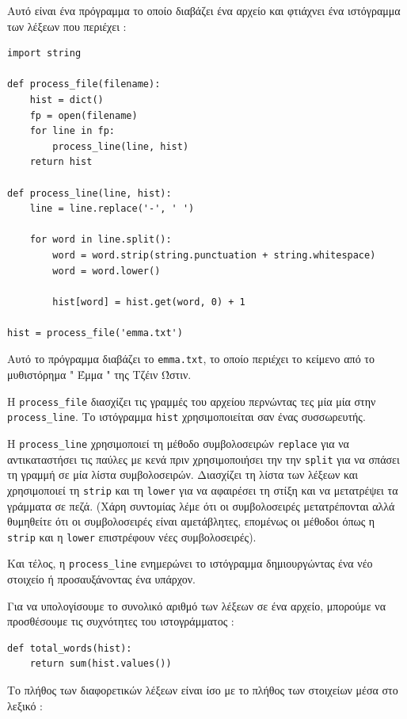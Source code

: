 \documentclass[10pt]{book}
\begin{document}
 Αυτό είναι ένα πρόγραμμα το οποίο διαβάζει ένα αρχείο και φτιάχνει ένα ιστόγραμμα των λέξεων που περιέχει :

\begin{verbatim}
import string

def process_file(filename):
    hist = dict()
    fp = open(filename)
    for line in fp:
        process_line(line, hist)
    return hist

def process_line(line, hist):
    line = line.replace('-', ' ')

    for word in line.split():
        word = word.strip(string.punctuation + string.whitespace)
        word = word.lower()

        hist[word] = hist.get(word, 0) + 1

hist = process_file('emma.txt')
\end{verbatim}
%
 Αυτό το πρόγραμμα διαβάζει το  {\tt emma.txt},  το οποίο περιέχει το κείμενο από το μυθιστόρημα  " Έμμα "  της Τζέιν Ώστιν.

Η  \verb"process_file"  διασχίζει τις γραμμές του αρχείου περνώντας τες μία μία στην  \verb"process_line".  Το ιστόγραμμα  {\tt hist}  χρησιμοποιείται σαν ένας συσσωρευτής.

Η  \verb"process_line"  χρησιμοποιεί τη μέθοδο συμβολοσειρών  {\tt replace}  για να αντικαταστήσει τις παύλες με κενά πριν χρησιμοποιήσει την την  {\tt split}  για να σπάσει τη γραμμή σε μία λίστα συμβολοσειρών. Διασχίζει τη λίστα των λέξεων και χρησιμοποιεί τη  {\tt strip}  και τη  {\tt lower}  για να αφαιρέσει τη στίξη και να μετατρέψει τα γράμματα σε πεζά. (Χάρη συντομίας λέμε ότι οι συμβολοσειρές μετατρέπονται αλλά θυμηθείτε ότι οι συμβολοσειρές είναι αμετάβλητες, επομένως οι μέθοδοι όπως η  {\tt strip}  και η  {\tt lower}  επιστρέφουν νέες συμβολοσειρές).

Και τέλος, η  \verb"process_line"  ενημερώνει το ιστόγραμμα δημιουργώντας ένα νέο στοιχείο ή προσαυξάνοντας ένα υπάρχον.

Για να υπολογίσουμε το συνολικό αριθμό των λέξεων σε ένα αρχείο, μπορούμε να προσθέσουμε τις συχνότητες του ιστογράμματος :

\begin{verbatim}
def total_words(hist):
    return sum(hist.values())
\end{verbatim}
%
 Το πλήθος των διαφορετικών λέξεων είναι ίσο με το πλήθος των στοιχείων μέσα στο λεξικό :
\end{document}
